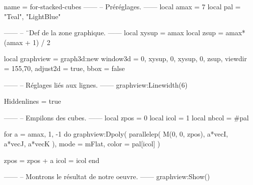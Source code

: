 \documentclass[border = 3pt]{standalone}
\begin{document}
\begin{luadraw*}{name = for-stacked-cubes}
------
-- Préréglages.
------
local amax = 7
local pal  = {"Teal", "LightBlue"}

------
-- ¨Def de la zone graphique.
------
local xysup = amax
local zsup  = amax*(amax + 1) / 2

local graphview = graph3d:new{
  window3d = {0, xysup, 0, xysup, 0, zsup},
  viewdir  = {155,70},
  adjust2d = true,
  bbox     = false
}

------
-- Réglages liés aux lignes.
------
graphview:Linewidth(6)

Hiddenlines = true

------
-- Empilons des cubes.
------
local zpos  = 0
local icol  = 1
local nbcol = #pal

for a = amax, 1, -1 do
  graphview:Dpoly(
    parallelep(
      M(0, 0, zpos),
      a*vecI, a*vecJ, a*vecK
    ),
    {
      mode  = mFlat,
      color = pal[icol]
    }
  )

  zpos = zpos + a
  icol = icol %
end

------
-- Montrons le résultat de notre oeuvre.
------
graphview:Show()
\end{luadraw*}
\end{document}
